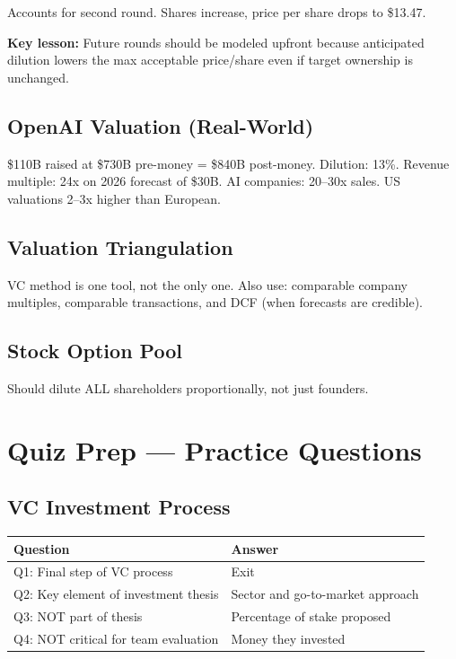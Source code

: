 \documentclass[a4paper,11pt]{article}
\begin{document}
Accounts for second round. Shares increase, price per share drops to \$13.47.

\textbf{Key lesson:} Future rounds should be modeled upfront because anticipated dilution lowers the max acceptable price/share even if target ownership is unchanged.

\subsection{OpenAI Valuation (Real-World)}

\$110B raised at \$730B pre-money = \$840B post-money. Dilution: 13\%. Revenue multiple: 24x on 2026 forecast of \$30B. AI companies: 20--30x sales. US valuations 2--3x higher than European.

\subsection{Valuation Triangulation}

VC method is one tool, not the only one. Also use: comparable company multiples, comparable transactions, and DCF (when forecasts are credible).

\subsection{Stock Option Pool}

Should dilute ALL shareholders proportionally, not just founders.

\newpage

\section{Quiz Prep --- Practice Questions}

\subsection{VC Investment Process}

\begin{tabular}{@{}p{}p{}@{}}
\toprule
\textbf{Question} & \textbf{Answer} \\
\midrule
Q1: Final step of VC process & Exit \\
Q2: Key element of investment thesis & Sector and go-to-market approach \\
Q3: NOT part of thesis & Percentage of stake proposed \\
Q4: NOT critical for team evaluation & Money they invested \\
\bottomrule
\end{tabular}
\end{document}
